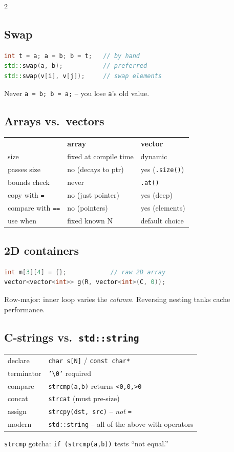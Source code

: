 \documentclass[10pt]{article}
\begin{document}
\begin{multicols}{2}
\subsection*{Swap}
\begin{lstlisting}[language=C++]
int t = a; a = b; b = t;   // by hand
std::swap(a, b);           // preferred
std::swap(v[i], v[j]);     // swap elements
\end{lstlisting}
Never \texttt{a = b; b = a;} -- you lose \texttt{a}'s old value.

\subsection*{Arrays vs.\ vectors}
\begin{tabular}{@{}lll@{}}
                   & \textbf{array}       & \textbf{vector}\\
size               & fixed at compile time& dynamic\\
passes size        & no (decays to ptr)   & yes (\texttt{.size()})\\
bounds check       & never                & \texttt{.at()}\\
copy with \texttt{=}& no (just pointer)   & yes (deep)\\
compare with \texttt{==}& no (pointers)   & yes (elements)\\
use when           & fixed known N        & default choice
\end{tabular}

\subsection*{2D containers}
\begin{lstlisting}[language=C++]
int m[3][4] = {};            // raw 2D array
vector<vector<int>> g(R, vector<int>(C, 0));
\end{lstlisting}
Row-major: inner loop varies the \emph{column}. Reversing nesting
tanks cache performance.

\subsection*{C-strings vs.\ \texttt{std::string}}
\begin{tabular}{@{}ll@{}}
declare      & \texttt{char s[N]} / \texttt{const char*} \\
terminator   & \texttt{'\textbackslash 0'} required \\
compare      & \texttt{strcmp(a,b)} returns \texttt{<0,0,>0}\\
concat       & \texttt{strcat} (must pre-size) \\
assign       & \texttt{strcpy(dst, src)} -- \emph{not} \texttt{=} \\
modern       & \texttt{std::string} -- all of the above with operators
\end{tabular}
\texttt{strcmp} gotcha: \texttt{if (strcmp(a,b))} tests ``not equal.''


\end{multicols}
\end{document}

